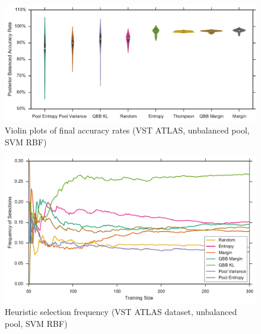 \begin{figure}[p]
	\centering
	\includegraphics[width=\textwidth]{figures/5_active/vstatlas_ur_ind_violin}
	\caption[Violin plots of final accuracy rates (VST ATLAS, unbalanced, SVM RBF)]{
		Violin plots of final accuracy rates (VST ATLAS, unbalanced pool, SVM RBF)}
	\label{fig:vstatlas_ur_ind_violin}
\end{figure}

\begin{figure}[p]
	\centering
	\includegraphics[width=\textwidth]{figures/5_thompson/vstatlas_ur_frequencies}
	\caption[Heuristic selection frequency (VST ATLAS, unbalanced, SVM RBF)]{
		Heuristic selection frequency (VST ATLAS dataset, unbalanced pool, SVM RBF)}
	\label{fig:vstatlas_ur_frequencies}
\end{figure}

